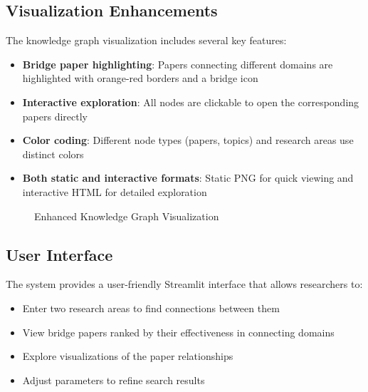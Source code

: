 \documentclass[11pt,a4paper]{article}
\begin{document}
\subsection{Visualization Enhancements}
The knowledge graph visualization includes several key features:
\begin{itemize}
    \item \textbf{Bridge paper highlighting}: Papers connecting different domains are highlighted with orange-red borders and a bridge icon
    \item \textbf{Interactive exploration}: All nodes are clickable to open the corresponding papers directly
    \item \textbf{Color coding}: Different node types (papers, topics) and research areas use distinct colors
    \item \textbf{Both static and interactive formats}: Static PNG for quick viewing and interactive HTML for detailed exploration
\end{itemize}

\begin{figure}[htbp]
\centering
{}
\caption{Enhanced Knowledge Graph Visualization}
\label{fig:graph_vis}
\end{figure}

\subsection{User Interface}
The system provides a user-friendly Streamlit interface that allows researchers to:
\begin{itemize}
    \item Enter two research areas to find connections between them
    \item View bridge papers ranked by their effectiveness in connecting domains
    \item Explore visualizations of the paper relationships
    \item Adjust parameters to refine search results
\end{itemize}
\end{document}

